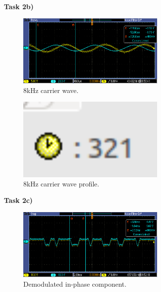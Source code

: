 \documentclass{article}
\begin{document}
\pagebreak

\pagebreak
\textbf{Task 2b)}

\begin{figure}[h]
  \begin{center}
    \includegraphics[width=0.65\textwidth]{img/task_2_b_oscilloscope.png}
    \caption{8kHz carrier wave.}
  \end{center}
\end{figure}

\begin{figure}[h]
  \begin{center}
    \includegraphics[width=0.65\textwidth]{img/task_2_b_profile.png}
    \caption{8kHz carrier wave profile.}
  \end{center}
\end{figure}

\pagebreak
\textbf{Task 2c)}

\begin{figure}[h]
  \begin{center}
    \includegraphics[width=0.65\textwidth]{img/task_2_c_oscilloscope.png}
    \caption{Demodulated in-phase component.}
  \end{center}
\end{figure}
\end{document}
